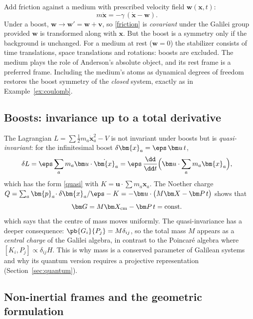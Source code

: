 Add friction against a medium with prescribed velocity field $\bm w({\bm{x}},t)$:
\begin{equation}\label{friction}
  m\ddot{\bm{x}}=-\gamma\,(\dot{\bm{x}}-\bm w).
\end{equation}
Under a boost, $\bm w\to\bm w'=\bm w+{\bm{v}}$, so \eqref{friction} is
\emph{covariant} under the Galilei group provided $\bm w$ is transformed
along with ${\bm{x}}$. But the boost is a symmetry only if the background is
unchanged. For a medium at rest ($\bm w=0$) the stabilizer consists of time
translations, space translations and rotations: boosts are excluded. The medium
plays the role of Anderson's absolute object, and its rest frame is a
preferred frame. Including the medium's atoms as dynamical degrees of
freedom restores the boost symmetry of the \emph{closed} system, exactly as in
Example~\ref{ex:coulomb}.

\subsection{Boosts: invariance up to a total derivative}

The Lagrangian $L=\sum\tfrac12m_a\dot{\bm{x}}_a^2-V$ is not invariant under boosts
but is \emph{quasi-invariant}: for the infinitesimal boost
$\delta{\bm{x}}_a=\eps\,\bm u\,t$,
\begin{equation}
  \delta L=\eps\sum_a m_a\bm u\cdot\dot{\bm{x}}_a=\eps\,\frac{\dd}{\dd t}\Big(\bm u\cdot\sum_a m_a{\bm{x}}_a\Big),
\end{equation}
which has the form \eqref{quasi} with $K=\bm u\cdot\sum m_a{\bm{x}}_a$. The
Noether charge $Q=\sum_a{\bm{p}}_a\!\cdot\delta{\bm{x}}_a/\eps-K=-\bm u\cdot\big(M\bm X-\bm P\,t\big)$
shows that
\begin{equation}
  \bm G=M\bm X_{\rm cm}-\bm P\,t=\text{const.}
\end{equation}
which says that the centre of mass moves uniformly. The quasi-invariance has a
deeper consequence: $\pb{G_i}{P_j}=M\delta_{ij}$, so the total mass $M$
appears as a \emph{central charge} of the Galilei algebra, in contrast to
the Poincar\'e algebra where $[K_i,P_j]\propto\delta_{ij}H$. This is why mass
is a conserved parameter of Galilean systems and why its quantum version
requires a projective representation (Section~\ref{sec:quantum}).

\subsection{Non-inertial frames and the geometric formulation}

